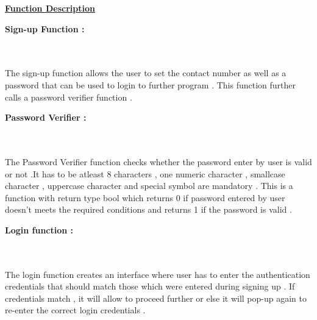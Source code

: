 \documentclass[11pt, a4paper]{article}
\begin{document}
\lstlistoflistings

\newpage

\vspace{1cm}
\begin{center}
    \LARGE{\textbf\underline{{Function Description}}}
\end{center}
\hline
\vspace{1.5cm}
\begin{left}
    \textbf{\Large{\hspace{0.5cm}Sign-up Function :}}
\end{left}
\\\\\large{
{The sign-up function allows\vspace{2mm} the user to set the contact number as well as a password that can be used to login to further program . This function further calls a password verifier function .
}}
\\
\vspace{0.7cm}

\begin{left}
    \textbf{\Large{Password Verifier :}}
\end{left}
\\\\
\large{{The Password Verifier function checks\vspace{2mm} whether the password enter by user is valid or not .It has to be atleast 8 characters , one numeric character , smallcase character\vspace{2mm}  , uppercase character and special symbol are mandatory .
This is a function with return type bool \vspace{2mm} which returns 0 if password\vspace{2mm} entered by user doesn't meets the required conditions and returns 1 if the password is valid .
}}
\\
\vspace{0.7cm}

\begin{left}
    \textbf{\Large{Login function :}}
\end{left}
\\\\
\large{{The login function creates an interface \vspace{2mm}where user has to enter the authentication credentials that should match \vspace{2mm}those which were entered during signing up . If credentials match , it will allow to proceed further or else it will pop-up again to re-enter the correct login credentials .
}}
\\
\vspace{0.7cm}
\end{document}
